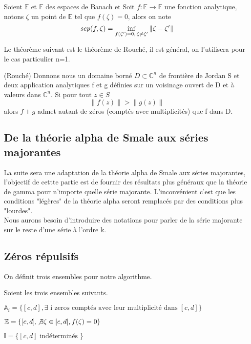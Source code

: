 \documentclass[a4paper,10.5pt]{article}
\begin{document}
	\begin{definition} Soient $\mathbb{E}$ et $\mathbb{F}$ des espaces de Banach et 
		Soit $f:\mathbb{E}\rightarrow \mathbb{F}$ une fonction analytique, notons $\zeta$ un point de $\mathbb{E}$ tel que $f(\zeta)=0$, alors on note
		\begin{equation}
		 sep(f,\zeta)=\inf_{f(\zeta ')=0, \hspace{0.5mm} \zeta \neq \zeta '}\left\|\zeta-\zeta '\right\|
		\end{equation}
		
	\end{definition}
	Le théorème suivant est le théorème de Rouché, il est général, on l'utilisera pour le cas particulier n=1.

	\begin{theorem}(Rouché) Donnons nous un domaine borné $D \subset \mathbb{C}^{n}$ de frontière de Jordan S et deux application analytiques f et g définies sur un voisinage ouvert de D et à valeurs dans $\mathbb{C}^n$. Si pour tout $z \in S$ 
	\[\left\|f(z)\right\|>\left\|g(z)\right\|\]
	alors $f+g$ admet autant de zéros (comptés avec multiplicités) que f dans D.
	\end{theorem}
	
	
	\subsection{De la théorie alpha de Smale aux séries majorantes}
	
	La suite sera une adaptation de la théorie alpha de Smale aux séries majorantes, l'objectif de cettte partie est de fournir des résultats plus généraux que la théorie de gamma pour n'importe quelle série majorante. L'inconvénient c'est que les conditions "légères" de la théorie alpha seront remplacés par des conditions plus "lourdes". \cite{dedieu2006points}\\
	Nous aurons besoin d'introduire des notations pour parler de la série majorante sur le reste d'une série à l'ordre k.
	
	
	\subsection{Zéros répulsifs}
	On définit trois ensembles pour notre algorithme.
	\begin{definition} Soient les trois ensembles suivants.
		
	$\mathbb{A}_i=\{[c,d], \exists \text{ i zeros comptés avec leur multiplicité dans } [c,d]\}$
	
	$\mathbb{E}=\{[c,d], \not\exists \zeta \in [c,d], f(\zeta)=0\}$
	
	$\mathbb{I}=\{[c,d] \text{ indéterminés }\}$\\
	\end{definition}
\end{document}
